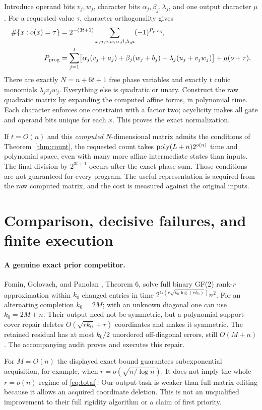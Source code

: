 \documentclass[11pt,a4paper]{article}
\theoremstyle{remark}\newtheorem{remark}[theorem]{Remark}
\begin{document}
Introduce operand bits $v_j,w_j$, character bits
$\alpha_j,\beta_j,\lambda_j$, and one output character $\mu$.
For a requested value $\tau$, character orthogonality gives
\begin{align}
\#\{x:o(x)=\tau\}
&=2^{-(3t+1)}
 \sum_{x,u,v,w,\alpha,\beta,\lambda,\mu}
 (-1)^{P_{\rm prog}},\label{eq:program}\\
P_{\rm prog}
&=\sum_{j=1}^t
 \bigl[\alpha_j(v_j+a_j)+\beta_j(w_j+b_j)
       +\lambda_j(u_j+v_jw_j)\bigr]
 +\mu(o+\tau).\nonumber
\end{align}
There are exactly $N=n+6t+1$ free phase variables and exactly
$t$ cubic monomials $\lambda_jv_jw_j$. Everything else is
quadratic or unary. Construct the raw quadratic matrix by
expanding the computed affine forms, in polynomial time.
Each character enforces one constraint with a factor two;
acyclicity makes all gate and operand bits unique for each
$x$. This proves the exact normalization.

If $t=O(n)$ and this \emph{computed} $N$-dimensional matrix
admits the conditions of Theorem~\ref{thm:count}, the requested
count takes $\operatorname{poly}(L+n)2^{o(n)}$ time and polynomial space,
even with many more affine intermediate states than inputs.
The final division by $2^{3t+1}$ occurs after the exact phase
sum. Those conditions are not guaranteed for every program.
The useful representation is acquired from the raw computed
matrix, and the cost is measured against the original inputs.

\section{Comparison, decisive failures, and finite execution}
\label{sec:comparison}
\paragraph{A genuine exact prior competitor.}
Fomin, Golovach, and Panolan \cite{fgp}, Theorem 6, solve full
binary GF(2) rank-$r$ approximation within $k_0$ changed entries
in time $2^{O(r\sqrt{k_0\log(rk_0)})}n^2$.
For an alternating completion $k_0=2M$; with an unknown
diagonal one can use $k_0=2M+n$. Their output need not be
symmetric, but a polynomial support-cover repair deletes
$O(\sqrt{rk_0}+r)$ coordinates and makes it symmetric.
The retained residual has at most $k_0/2$ unordered
off-diagonal errors, still $O(M+n)$. The accompanying
audit proves and executes this repair.

For $M=O(n)$ the displayed exact bound guarantees
subexponential acquisition, for example, when
$r=o(\sqrt{n/\log n})$. It does not imply the whole
$r=o(n)$ regime of \eqref{eq:total}. Our output task is
weaker than full-matrix editing because it allows an acquired
coordinate deletion. This is not an unqualified improvement
to their full rigidity algorithm or a claim of first priority.
\end{document}
